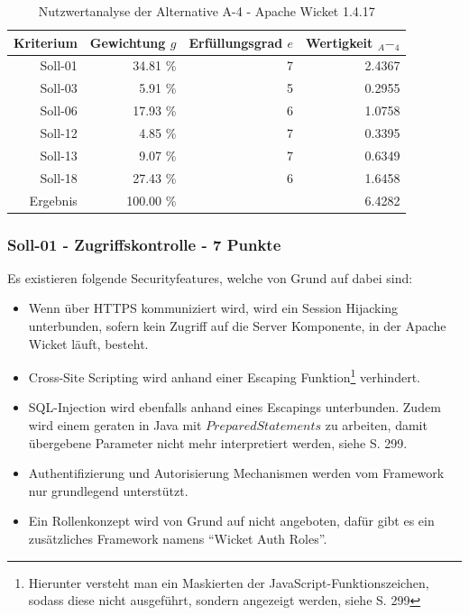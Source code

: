   \begin{table}[ht]
    \sffamily 
    \begin{center}
      \begin{tabular}{r|rrr}
        \toprule
        \textbf{Kriterium} & \textbf{Gewichtung \(g\)} & \textbf{Erfüllungsgrad
        \(e\)} & \textbf{Wertigkeit \(_A-_4\)} \\
        \midrule
        Soll-01   & 34.81 \% & 7 & 2.4367 \\
        Soll-03   &  5.91 \% & 5 & 0.2955 \\
        Soll-06   & 17.93 \% & 6 & 1.0758 \\
        Soll-12   &  4.85 \% & 7 & 0.3395 \\
        Soll-13   &  9.07 \% & 7 & 0.6349 \\
        Soll-18   & 27.43 \% & 6 & 1.6458 \\
        \midrule
        \midrule
        Ergebnis  & 100.00 \% &   & 6.4282 \\
        \bottomrule
      \end{tabular}
      \caption{Nutzwertanalyse der Alternative A-4 - Apache Wicket 1.4.17}
      \label{tab:nwaA4}
    \end{center}
  \end{table}
  
  \subsubsection{Soll-01 - Zugriffskontrolle - 7 Punkte}
  
  Es existieren folgende Securityfeatures, welche von Grund auf dabei sind:
  
  \begin{itemize}
    \item Wenn über HTTPS kommuniziert wird, wird ein Session Hijacking
    unterbunden, sofern kein Zugriff auf die Server Komponente, in der Apache
    Wicket läuft, besteht.
    \item Cross-Site Scripting wird anhand einer Escaping
    Funktion\footnote{Hierunter versteht man ein Maskierten der
    JavaScript-Funktionszeichen, sodass diese nicht ausgeführt, sondern
    angezeigt werden, siehe \cite{Wicket} S. 299} verhindert.
    \item SQL-Injection wird ebenfalls anhand eines Escapings unterbunden. Zudem
    wird einem geraten in Java mit \(PreparedStatements\) zu arbeiten, damit
    übergebene Parameter nicht mehr interpretiert werden, siehe \cite{Wicket} S.
    299.
    \item Authentifizierung und Autorisierung Mechanismen werden vom Framework
    nur grundlegend unterstützt. 
    \item Ein Rollenkonzept wird von Grund auf nicht angeboten, dafür gibt es
    ein zusätzliches Framework namens ``Wicket Auth Roles''. 
  \end{itemize}
  
